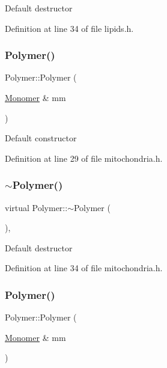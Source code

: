 Default destructor 

Definition at line 34 of file lipids.\+h.

\mbox{\label{class_polymer_ae77454a3908652e4df6a26b9cac509a5}} 
\subsubsection{\texorpdfstring{Polymer()}{Polymer()}\hspace{0.1cm}{\footnotesize\ttfamily [7/14]}}
{\footnotesize\ttfamily Polymer\+::\+Polymer (\begin{DoxyParamCaption}\item[{\mbox{\hyperlink{class_monomer}{Monomer}} \&}]{mm }\end{DoxyParamCaption})\hspace{0.3cm}{\ttfamily [inline]}}

Default constructor 

Definition at line 29 of file mitochondria.\+h.

\mbox{\label{class_polymer_aac2b3983f375a5691c7d5ca1a79594d5}} 
\subsubsection{\texorpdfstring{$\sim$\+Polymer()}{~Polymer()}\hspace{0.1cm}{\footnotesize\ttfamily [7/11]}}
{\footnotesize\ttfamily virtual Polymer\+::$\sim$\+Polymer (\begin{DoxyParamCaption}{ }\end{DoxyParamCaption})\hspace{0.3cm}{\ttfamily [inline]}, {\ttfamily [virtual]}}

Default destructor 

Definition at line 34 of file mitochondria.\+h.

\mbox{\label{class_polymer_ae77454a3908652e4df6a26b9cac509a5}} 
\subsubsection{\texorpdfstring{Polymer()}{Polymer()}\hspace{0.1cm}{\footnotesize\ttfamily [8/14]}}
{\footnotesize\ttfamily Polymer\+::\+Polymer (\begin{DoxyParamCaption}\item[{\mbox{\hyperlink{class_monomer}{Monomer}} \&}]{mm }\end{DoxyParamCaption})\hspace{0.3cm}{\ttfamily [inline]}}

